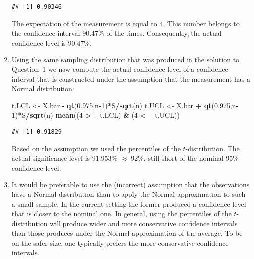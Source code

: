 \documentclass[]{krantz}
\makeatletter
\newenvironment{Shaded}{\begin{snugshade}}{\end{snugshade}}
\newcommand{\KeywordTok}[1]{\textcolor[rgb]{0.13,0.29,0.53}{\textbf{#1}}}
\newcommand{\DecValTok}[1]{\textcolor[rgb]{0.00,0.00,0.81}{#1}}
\newcommand{\FloatTok}[1]{\textcolor[rgb]{0.00,0.00,0.81}{#1}}
\newcommand{\StringTok}[1]{\textcolor[rgb]{0.31,0.60,0.02}{#1}}
\newcommand{\OperatorTok}[1]{\textcolor[rgb]{0.81,0.36,0.00}{\textbf{#1}}}
\newcommand{\NormalTok}[1]{#1}
\newenvironment{kframe}{%
\medskip{}
\setlength{\fboxsep}{.8em}
 \def\at@end@of@kframe{}%
 \ifinner\ifhmode%
  \def\at@end@of@kframe{\end{minipage}}%
  \begin{minipage}{\columnwidth}%
 \fi\fi%
 \def\FrameCommand##1{\hskip\@totalleftmargin \hskip-\fboxsep
 \colorbox{shadecolor}{##1}\hskip-\fboxsep
     \hskip-\linewidth \hskip-\@totalleftmargin \hskip\columnwidth}%
 \MakeFramed {\advance\hsize-\width
   \@totalleftmargin\z@ \linewidth\hsize
   \@setminipage}}%
 {\par\unskip\endMakeFramed%
 \at@end@of@kframe}
\renewenvironment{Shaded}{\begin{kframe}}{\end{kframe}}
\theoremstyle{definition}
\theoremstyle{definition}
\theoremstyle{definition}
\theoremstyle{remark}
\makeatother
\begin{document}
\begin{enumerate}
\begin{verbatim}
## [1] 0.90346
\end{verbatim}

  The expectation of the measurement is equal to 4. This number belongs
  to the confidence interval 90.47\% of the times. Consequently, the
  actual confidence level is 90.47\%.
\item
  Using the same sampling distribution that was produced in the solution
  to Question~1 we now compute the actual confidence level of a
  confidence interval that is constructed under the assumption that the
  measurement has a Normal distribution:

\begin{Shaded}
\begin{Highlighting}[]
\NormalTok{t.LCL <-}\StringTok{ }\NormalTok{X.bar }\OperatorTok{-}\StringTok{ }\KeywordTok{qt}\NormalTok{(}\FloatTok{0.975}\NormalTok{,n}\OperatorTok{-}\DecValTok{1}\NormalTok{)}\OperatorTok{*}\NormalTok{S}\OperatorTok{/}\KeywordTok{sqrt}\NormalTok{(n)}
\NormalTok{t.UCL <-}\StringTok{ }\NormalTok{X.bar }\OperatorTok{+}\StringTok{ }\KeywordTok{qt}\NormalTok{(}\FloatTok{0.975}\NormalTok{,n}\OperatorTok{-}\DecValTok{1}\NormalTok{)}\OperatorTok{*}\NormalTok{S}\OperatorTok{/}\KeywordTok{sqrt}\NormalTok{(n)}
\KeywordTok{mean}\NormalTok{((}\DecValTok{4} \OperatorTok{>=}\StringTok{ }\NormalTok{t.LCL) }\OperatorTok{&}\StringTok{ }\NormalTok{(}\DecValTok{4} \OperatorTok{<=}\StringTok{ }\NormalTok{t.UCL))}
\end{Highlighting}
\end{Shaded}

\begin{verbatim}
## [1] 0.91829
\end{verbatim}

  Based on the assumption we used the percentiles of the
  \(t\)-distribution. The actual significance level is 91.953\%
  \(\approx\) 92\%, still short of the nominal 95\% confidence level.
\item
  It would be preferable to use the (incorrect) assumption that the
  observations have a Normal distribution than to apply the Normal
  approximation to such a small sample. In the current setting the
  former produced a confidence level that is closer to the nominal one.
  In general, using the percentiles of the \(t\)-distribution will
  produce wider and more conservative confidence intervals than those
  produces under the Normal approximation of the average. To be on the
  safer size, one typically prefers the more conservative confidence
  intervals.
\end{enumerate}
\end{document}
